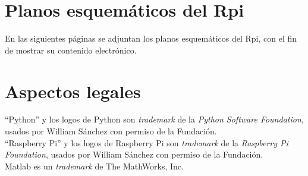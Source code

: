 \documentclass[11pt,lettersize]{article} %
\begin{document}
\appendix
\cleardoublepage 
\section{Planos esquemáticos del Rpi}
En las siguientes páginas se adjuntan los planos esquemáticos del Rpi, con el fin de mostrar su contenido electrónico.








\cleardoublepage {}
\section*{Aspectos legales}

``Python'' y los logos de Python son \textit{trademark} de la \textit{Python Software Foundation}, usados por William Sánchez con permiso de la Fundación. \\


``Raspberry Pi'' y los logos de Raspberry Pi son \textit{trademark} de la \textit{Raspberry Pi Foundation}, usados por William Sánchez con permiso de la Fundación. \\


Matlab es un \textit{trademark} de The MathWorks, Inc.




%
\end{document}
